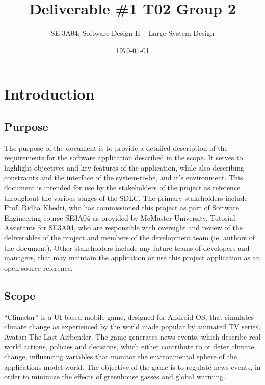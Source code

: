 \documentclass[]{article}
\title{Deliverable \#1 T02 Group 2}
\author{SE 3A04: Software Design II -- Large System Design}
\date{\today}
\begin{document}
\maketitle	

\section{Introduction}
\label{sec:introduction}
\subsection{Purpose}
\label{sub:purpose}
	The purpose of the document is to provide a detailed description of the requirements for the software application described in the scope. It serves to highlight objectives and key features of the application, while also describing constraints and the interface of the system-to-be, and it's environment. This document is intended for use by the stakeholders of the project as reference throughout the various stages of the SDLC. The primary stakeholders include Prof. Ridha Khedri, who has commissioned this project as part of Software Engineering course SE3A04 as provided by McMaster University, Tutorial Assistants for SE3A04, who are responsible with oversight and review of the deliverables of the project and members of the development team (ie. authors of the document). Other stakeholders include any future teams of developers and managers, that may maintain the application or use this project application as an open source reference. 

\subsection{Scope}
\label{sub:scope}
	“Climatar” is a UI based mobile game, designed for Android OS, that simulates climate change as experienced by the world made popular by animated TV series, Avatar: The Last Airbender. The game generates news events, which describe real world actions, policies and decisions, which either contribute to or deter climate change, influencing variables that monitor the environmental sphere of the applications model world. The objective of the game is to regulate news events, in order to minimize the effects of greenhouse gasses and global warming.
\end{document}
